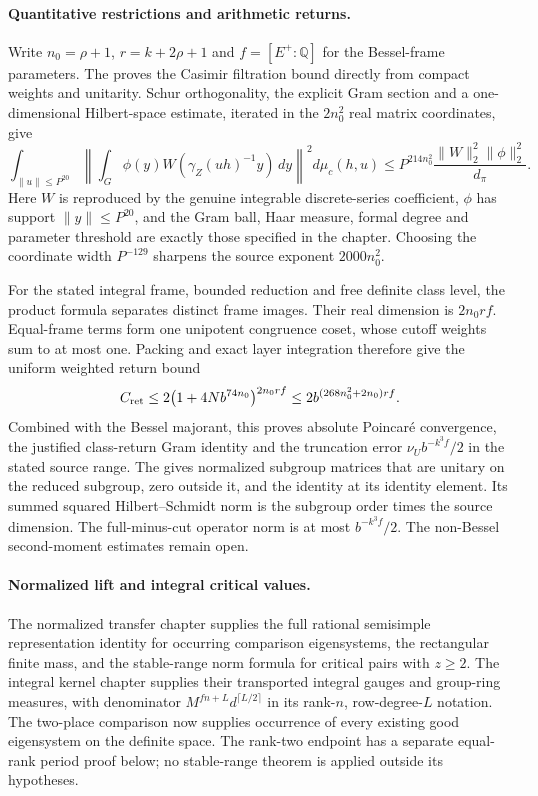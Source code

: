 \paragraph{Quantitative restrictions and arithmetic returns.}
Write \(n_0=\rho+1\), \(r=k+2\rho+1\) and
\(f=[E^+:\mathbb Q]\) for the Bessel-frame parameters.
The  proves the Casimir filtration bound directly from compact
weights and unitarity. Schur orthogonality, the explicit Gram section
and a one-dimensional Hilbert-space estimate, iterated in the
\(2n_0^2\) real matrix coordinates, give
\[
 \int_{\|u\|\le P^{20}}
 \left\|\int_G\phi(y)W(\gamma_Z(uh)^{-1}y)\,dy\right\|^2
 d\mu_c(h,u)
 \le P^{214n_0^2}\frac{\|W\|_2^2\|\phi\|_2^2}{d_\pi}.
\]
Here \(W\) is reproduced by the genuine integrable discrete-series
coefficient, \(\phi\) has support \(\|y\|\le P^{20}\), and the
Gram ball, Haar measure, formal degree and parameter threshold are
exactly those specified in the chapter. Choosing the coordinate
width \(P^{-129}\) sharpens the source exponent \(2000n_0^2\).

For the stated integral frame, bounded reduction and free definite
class level, the product formula separates distinct frame images.
Their real dimension is \(2n_0rf\). Equal-frame terms form one
unipotent congruence coset, whose cutoff weights sum to at most one.
Packing and exact layer integration therefore give the uniform
weighted return bound
\[
 C_{\rm ret}\le
 2\bigl(1+4Nb^{74n_0}\bigr)^{2n_0rf}
 \le 2b^{(268n_0^2+2n_0)rf}.
\]
Combined with the Bessel majorant, this proves absolute Poincar\'e
convergence, the justified class-return Gram identity and the
truncation error \(\nu_U b^{-k^3f}/2\) in the stated source range.
The  gives normalized subgroup matrices that are unitary on the reduced subgroup, zero outside it, and the identity at its identity element. Its summed squared Hilbert--Schmidt norm is the subgroup order times the source dimension. The full-minus-cut operator norm is at most $b^{-k^3 f}/2$. The non-Bessel second-moment estimates remain open.

\paragraph{Normalized lift and integral critical values.}
The 
{normalized transfer chapter} supplies the full rational semisimple
representation identity for occurring comparison eigensystems,
the rectangular finite mass, and the stable-range norm formula
for critical pairs with $z\ge2$.
The 
{integral kernel chapter} supplies their transported integral gauges
and group-ring measures, with denominator
$M^{fn+L}d^{\lceil L/2\rceil}$ in its rank-$n$, row-degree-$L$
notation. The two-place comparison now supplies occurrence of every
existing good eigensystem on the definite space. The rank-two endpoint
has a separate equal-rank period proof below; no stable-range theorem
is applied outside its hypotheses.


